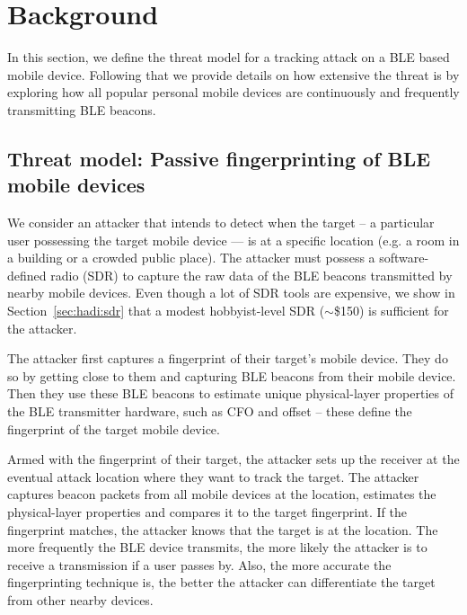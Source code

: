 \section{Background}

\label{sec:threatmodel}

In this section, we define the threat model for a tracking attack on a BLE based mobile device. 
%
Following that we provide details on how extensive the threat is by exploring how all popular personal mobile devices are continuously and frequently transmitting BLE beacons.



\subsection{Threat model: Passive fingerprinting of BLE mobile devices}
%
We consider an attacker that intends to detect when the target -- a particular user possessing the target mobile device --- is at a specific location (e.g. a room in a building or a crowded public place).
%
The attacker must possess a software-defined radio (SDR) to capture the raw \iq data of the BLE beacons transmitted by nearby mobile devices.
%
Even though a lot of SDR tools are expensive, we show in Section~\ref{sec:hadi:sdr} that a modest hobbyist-level SDR ($\sim$\$150) is sufficient for the attacker.
%

The attacker first captures a fingerprint of their target's mobile device.
%
They do so by getting close to them and capturing BLE beacons from their mobile device.
%
Then they use these BLE beacons to estimate unique physical-layer properties of the BLE transmitter hardware, such as CFO and \iq offset -- these define the fingerprint of the target mobile device.
%

Armed with the fingerprint of their target, the attacker sets up the receiver at the eventual attack location where they want to track the target.
%
The attacker captures beacon packets from all mobile devices at the location, estimates the physical-layer properties and compares it to the target fingerprint.
%
If the fingerprint matches, the attacker knows that the target is at the location.
%
The more frequently the BLE device transmits, the more likely the attacker is
to receive a transmission if a user passes by.  Also, the more accurate the
fingerprinting technique is, the better the attacker can differentiate the
target from other nearby devices.
%

